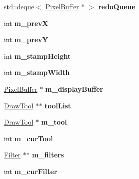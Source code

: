 \begin{DoxyCompactItemize}
{{\item 
\hypertarget{classMIAApp_a75cc180e177c43e20762b3efbce9e641}{std\-::deque$<$ \hyperlink{classPixelBuffer}{Pixel\-Buffer} $\ast$ $>$ {\bfseries redo\-Queue}}\label{classMIAApp_a75cc180e177c43e20762b3efbce9e641}

\item 
\hypertarget{classMIAApp_adcea1fb15d81c44996df552b86e89422}{int {\bfseries m\-\_\-prev\-X}}\label{classMIAApp_adcea1fb15d81c44996df552b86e89422}

\item 
\hypertarget{classMIAApp_a604f4f23b559c618a830730c8bd490e5}{int {\bfseries m\-\_\-prev\-Y}}\label{classMIAApp_a604f4f23b559c618a830730c8bd490e5}

\item 
\hypertarget{classMIAApp_aebea0628c1f88a38c89fddf921621333}{int {\bfseries m\-\_\-stamp\-Height}}\label{classMIAApp_aebea0628c1f88a38c89fddf921621333}

\item 
\hypertarget{classMIAApp_aef09a3e4ca4a7b9df22bc5da1b0824b6}{int {\bfseries m\-\_\-stamp\-Width}}\label{classMIAApp_aef09a3e4ca4a7b9df22bc5da1b0824b6}

\item 
\hypertarget{classMIAApp_a0668047939beaf5bdcce629b5c109f76}{\hyperlink{classPixelBuffer}{Pixel\-Buffer} $\ast$ {\bfseries m\-\_\-display\-Buffer}}\label{classMIAApp_a0668047939beaf5bdcce629b5c109f76}

\item 
\hypertarget{classMIAApp_ad6c43f1bb4d3b7fe2460abb828e0948e}{\hyperlink{classDrawTool}{Draw\-Tool} $\ast$$\ast$ {\bfseries tool\-List}}\label{classMIAApp_ad6c43f1bb4d3b7fe2460abb828e0948e}

\item 
\hypertarget{classMIAApp_a6c18367f5bd7e19a4676d374da94c32b}{\hyperlink{classDrawTool}{Draw\-Tool} $\ast$ {\bfseries m\-\_\-tool}}\label{classMIAApp_a6c18367f5bd7e19a4676d374da94c32b}

\item 
\hypertarget{classMIAApp_acbb2b661aaf03f8757a548b93049ac9d}{int {\bfseries m\-\_\-cur\-Tool}}\label{classMIAApp_acbb2b661aaf03f8757a548b93049ac9d}

\item 
\hypertarget{classMIAApp_a4e2092669438b4e90f9e7c27bc90192a}{\hyperlink{classFilter}{Filter} $\ast$$\ast$ {\bfseries m\-\_\-filters}}\label{classMIAApp_a4e2092669438b4e90f9e7c27bc90192a}

\item 
\hypertarget{classMIAApp_a25cd564aabd5882ebde3d92b0db6451f}{int {\bfseries m\-\_\-cur\-Filter}}\label{classMIAApp_a25cd564aabd5882ebde3d92b0db6451f}

}}
\end{DoxyCompactItemize}
